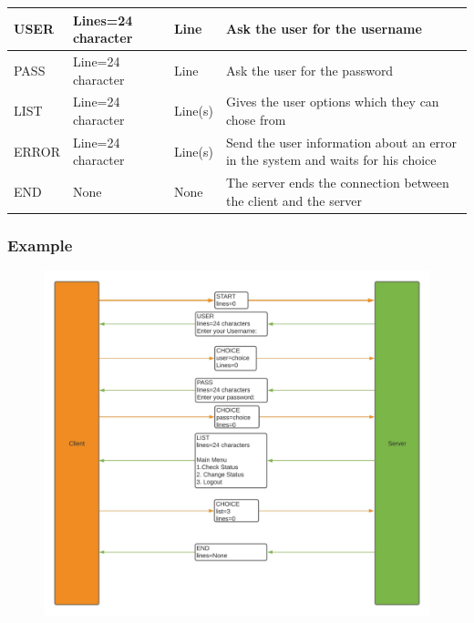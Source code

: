 \documentclass[11pt]{article}
\begin{document}
\begin{table}[H]
{\begin{tabular}{llll}
							\multicolumn{1}{|l|}{USER}                         & \multicolumn{1}{l|}{Lines=24 character}         & \multicolumn{1}{l|}{Line}    & \multicolumn{1}{l|}{Ask the user for the username}                                                          \\ \hline
							\multicolumn{1}{|l|}{PASS}                         & \multicolumn{1}{l|}{Line=24 character}          & \multicolumn{1}{l|}{Line}    & \multicolumn{1}{l|}{Ask the user for the password}                                                          \\ \hline
							\multicolumn{1}{|l|}{LIST}                         & \multicolumn{1}{l|}{Line=24 character}          & \multicolumn{1}{l|}{Line(s)} & \multicolumn{1}{l|}{Gives the user options which they can chose from}                                       \\ \hline
							\multicolumn{1}{|l|}{ERROR}                        & \multicolumn{1}{l|}{Line=24 character}          & \multicolumn{1}{l|}{Line(s)} & \multicolumn{1}{l|}{Send the user information about an error in the system and waits for his choice}        \\ \hline
							\multicolumn{1}{|l|}{END}                          & \multicolumn{1}{l|}{None}                       & \multicolumn{1}{l|}{None}    & \multicolumn{1}{l|}{The server ends the connection between the client and the server}                       \\ \hline
						\end{tabular}
					}
				\end{table}
			\subsubsection{Example}
				\begin{figure}[H]
					\centering
					\includegraphics[scale=0.7]{Examples}
					\label{fig:examples}
				\end{figure}
\end{document}
